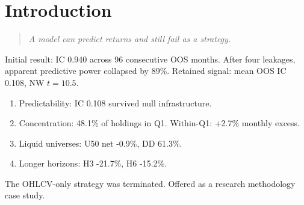 \section{Introduction}
\begin{quote}\textit{A model can predict returns and still fail as a strategy.}\end{quote}
Initial result: IC 0.940 across 96 consecutive OOS months. After four leakages, apparent predictive power collapsed by 89\%.
Retained signal: mean OOS IC 0.108, NW $t = 10.5$.
\begin{enumerate}[label=(\arabic*)]
    \item Predictability: IC 0.108 survived null infrastructure.
    \item Concentration: 48.1\% of holdings in Q1. Within-Q1: +2.7\% monthly excess.
    \item Liquid universes: U50 net -0.9\%, DD 61.3\%.
    \item Longer horizons: H3 -21.7\%, H6 -15.2\%.
\end{enumerate}
The OHLCV-only strategy was terminated. Offered as a research methodology case study.
